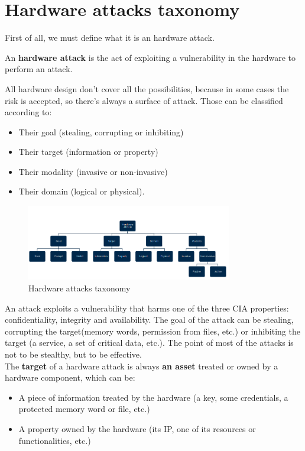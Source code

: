 \chapter{Hardware attacks taxonomy}
First of all, we must define what it is an hardware attack.
\begin{boxH}
  An \textbf{hardware attack} is the act of exploiting a vulnerability in the hardware to perform an
  attack.
\end{boxH}
All hardware design don't cover all the possibilities, because in some cases the risk is accepted,
so there's always a surface of attack. Those can be classified according to:
\begin{itemize}
  \item Their goal (stealing, corrupting or inhibiting)
  \item Their target (information or property)
  \item Their modality (invasive or non-invasive)
  \item Their domain (logical or physical).
\end{itemize}

\begin{figure}[H]
  \centering
  \includegraphics[width=0.8\textwidth]{img/hardware/hw attacks taxonomy.png}
  \caption{Hardware attacks taxonomy}
  \label{fig:hw-attacks-taxonomy}
\end{figure}

An attack exploits a vulnerability that harms one of the three CIA properties: confidentiality,
integrity and availability. The goal of the attack can be stealing, corrupting the target(memory
words, permission from files, etc.) or inhibiting the target (a service, a set of critical data, etc.).
The point of most of the attacks is not to be stealthy, but to be effective.\\
The \textbf{target} of a hardware attack is always \textbf{an asset} treated or owned by a hardware
component, which can be:
\begin{itemize}
  \item A piece of information treated by the hardware (a key, some credentials, a protected memory word
    or file, etc.)
  \item A property owned by the hardware (its IP, one of its resources or functionalities, etc.)
\end{itemize}

